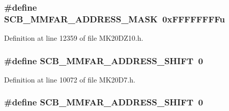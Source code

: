 \subsubsection[{\texorpdfstring{S\+C\+B\+\_\+\+M\+M\+F\+A\+R\+\_\+\+A\+D\+D\+R\+E\+S\+S\+\_\+\+M\+A\+SK}{SCB_MMFAR_ADDRESS_MASK}}]{\setlength{\rightskip}{0pt plus 5cm}\#define S\+C\+B\+\_\+\+M\+M\+F\+A\+R\+\_\+\+A\+D\+D\+R\+E\+S\+S\+\_\+\+M\+A\+SK~0x\+F\+F\+F\+F\+F\+F\+F\+Fu}\hypertarget{group___s_c_b___register___masks_gace4ff806f8aabb7e600007a84705b8fe}{}\label{group___s_c_b___register___masks_gace4ff806f8aabb7e600007a84705b8fe}


Definition at line 12359 of file M\+K20\+D\+Z10.\+h.

\subsubsection[{\texorpdfstring{S\+C\+B\+\_\+\+M\+M\+F\+A\+R\+\_\+\+A\+D\+D\+R\+E\+S\+S\+\_\+\+S\+H\+I\+FT}{SCB_MMFAR_ADDRESS_SHIFT}}]{\setlength{\rightskip}{0pt plus 5cm}\#define S\+C\+B\+\_\+\+M\+M\+F\+A\+R\+\_\+\+A\+D\+D\+R\+E\+S\+S\+\_\+\+S\+H\+I\+FT~0}\hypertarget{group___s_c_b___register___masks_ga0073a1a7ca16b1512b6e3b2029737938}{}\label{group___s_c_b___register___masks_ga0073a1a7ca16b1512b6e3b2029737938}


Definition at line 10072 of file M\+K20\+D7.\+h.

\subsubsection[{\texorpdfstring{S\+C\+B\+\_\+\+M\+M\+F\+A\+R\+\_\+\+A\+D\+D\+R\+E\+S\+S\+\_\+\+S\+H\+I\+FT}{SCB_MMFAR_ADDRESS_SHIFT}}]{\setlength{\rightskip}{0pt plus 5cm}\#define S\+C\+B\+\_\+\+M\+M\+F\+A\+R\+\_\+\+A\+D\+D\+R\+E\+S\+S\+\_\+\+S\+H\+I\+FT~0}\hypertarget{group___s_c_b___register___masks_ga0073a1a7ca16b1512b6e3b2029737938}{}\label{group___s_c_b___register___masks_ga0073a1a7ca16b1512b6e3b2029737938}


